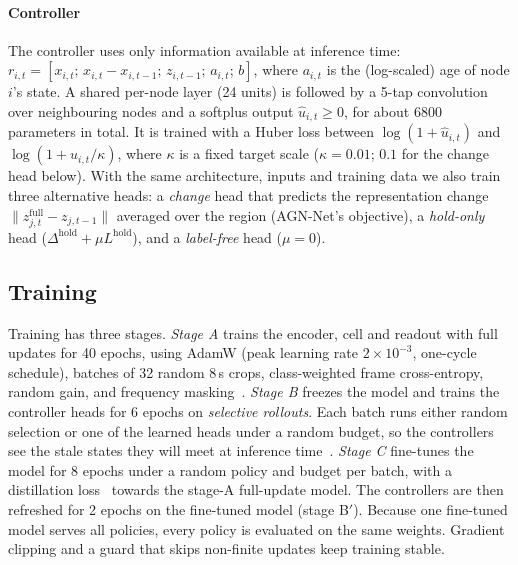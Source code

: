 \paragraph*{Controller}
The controller uses only information available at inference time: $r_{i,t}=[x_{i,t};\,x_{i,t}-x_{i,t-1};\,z_{i,t-1};\,a_{i,t};\,b]$, where $a_{i,t}$ is the (log-scaled) age of node $i$'s state. A shared per-node layer (24 units) is followed by a 5-tap convolution over neighbouring nodes and a softplus output $\hat u_{i,t}\ge0$, for about 6800 parameters in total. It is trained with a Huber loss between $\log(1+\hat u_{i,t})$ and $\log(1+u_{i,t}/\kappa)$, where $\kappa$ is a fixed target scale ($\kappa{=}0.01$; $0.1$ for the change head below). With the same architecture, inputs and training data we also train three alternative heads: a \emph{change} head that predicts the representation change $\|z^{\mathrm{full}}_{j,t}-z_{j,t-1}\|$ averaged over the region (AGN-Net's objective), a \emph{hold-only} head ($\Delta^{\mathrm{hold}}+\mu L^{\mathrm{hold}}$), and a \emph{label-free} head ($\mu{=}0$).

\subsection{Training}
\label{sec:training}
Training has three stages. \emph{Stage A} trains the encoder, cell and readout with full updates for 40 epochs, using AdamW (peak learning rate $2{\times}10^{-3}$, one-cycle schedule), batches of 32 random 8\,s crops, class-weighted frame cross-entropy, random gain, and frequency masking~\cite{park2019specaugment}. \emph{Stage B} freezes the model and trains the controller heads for 6 epochs on \emph{selective rollouts}. Each batch runs either random selection or one of the learned heads under a random budget, so the controllers see the stale states they will meet at inference time~\cite{ross2011reduction}. \emph{Stage C} fine-tunes the model for 8 epochs under a random policy and budget per batch, with a distillation loss~\cite{hinton2015distilling} towards the stage-A full-update model. The controllers are then refreshed for 2 epochs on the fine-tuned model (stage B$'$). Because one fine-tuned model serves all policies, every policy is evaluated on the same weights. Gradient clipping and a guard that skips non-finite updates keep training stable.

